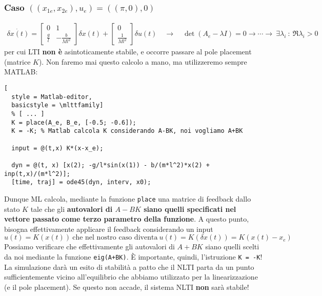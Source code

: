 \documentclass[a4paper]{report}
\begin{document}
\begin{esem}
\subsubsection{Caso $((x_{1e}, x_{2e}), u_e) = ((\pi,0), 0)$}
\begin{align*}
	\dot{\delta x(t)} = \begin{bmatrix}
 0 & 1 \\ \frac{g}{l} & - \frac{b}{Ml^2}	
 \end{bmatrix} \delta x(t) + \begin{bmatrix}
 	0 \\ \frac{1}{Ml^2}
 \end{bmatrix} \delta u(t) \quad \rightarrow \quad 
	\det(A_e - \lambda I) = 0 \rightarrow \cdots \rightarrow \ \exists \lambda_i \ : \ \Re{\lambda_i} > 0
\end{align*}
per cui LTI \textbf{non è} asintoticamente stabile, e occorre passare al pole placement (matrice $K$). Non faremo mai questo calcolo a mano, ma utilizzeremo sempre MATLAB:

\begin{lstlisting}[
  style = Matlab-editor,
  basicstyle = \mlttfamily]
  % [ ... ]
  K = place(A_e, B_e, [-0.5; -0.6]);
  K = -K; % Matlab calcola K considerando A-BK, noi vogliamo A+BK
  
  input = @(t,x) K*(x-x_e);
  
  dyn = @(t, x) [x(2); -g/l*sin(x(1)) - b/(m*l^2)*x(2) + inp(t,x)/(m*l^2)];
  [time, traj] = ode45(dyn, interv, x0);
\end{lstlisting}
Dunque ML calcola, mediante la funzione \texttt{place} una matrice di feedback dallo stato $K$ tale che gli \textbf{autovalori di $A-BK$ siano quelli specificati nel vettore passato come terzo parametro della funzione}. A questo punto, bisogna effettivamente applicare il feedback considerando un input $$u(t) = K(x(t)) \ \textrm{che nel nostro caso diventa} \ \boxed{u(t) =K(\delta x(t)) = K(x(t) - x_e)}$$
Possiamo verificare che effettivamente gli autovalori di $A+BK$ siano quelli scelti da noi mediante la funzione \texttt{eig(A+BK)}. È importante, quindi, l'istruzione \texttt{K = -K}! La simulazione darà un esito di stabilità a patto che il NLTI parta da un punto sufficientemente vicino all'equilibrio che abbiamo utilizzato per la linearizzazione (e il pole placement). Se questo non accade, il sistema NLTI \textbf{non} sarà stabile!


\end{esem}
\end{document}

